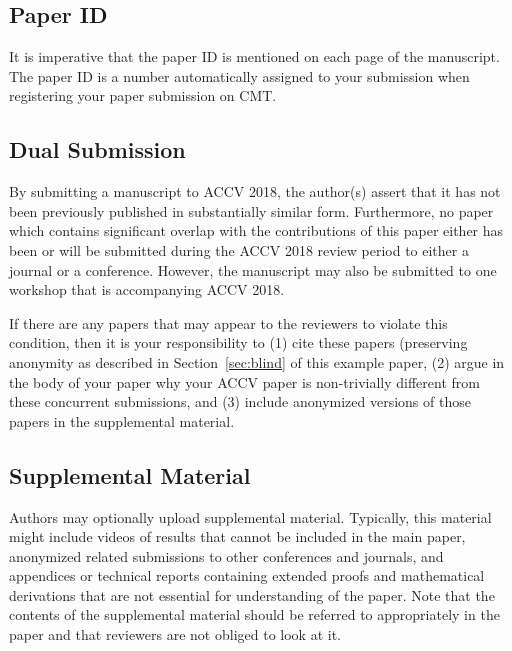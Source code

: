 \documentclass[runningheads]{llncs}
\begin{document}
\subsection{Paper ID}

It is imperative that the paper ID is mentioned on each page of the manuscript.
The paper ID is a number automatically assigned to your submission when 
registering your paper submission on CMT.

\subsection{Dual Submission}

By submitting a manuscript to ACCV 2018, the author(s) assert that it has
not been previously published in substantially similar
form. Furthermore, no paper which contains significant overlap with
the contributions of this paper either has been or will be submitted
during the ACCV 2018 review period to either a journal or a
conference. However, the manuscript may also be submitted to
one workshop that is accompanying ACCV 2018.

If there are any papers that may appear to the reviewers to violate
this condition, then it is your responsibility to (1) cite these
papers (preserving anonymity as described in Section~\ref{sec:blind}
of this example paper, (2) argue in the body of your paper why your
ACCV paper is non-trivially different from these concurrent
submissions, and (3) include anonymized versions of those papers in
the supplemental material.

\subsection{Supplemental Material} 

Authors may optionally upload supplemental material. Typically, this
material might include videos of results that cannot be included in
the main paper, anonymized related submissions to other conferences
and journals, and appendices or technical reports containing extended
proofs and mathematical derivations that are not essential for
understanding of the paper. Note that the contents of the supplemental
material should be referred to appropriately in the paper and that
reviewers are not obliged to look at it.
\end{document}
